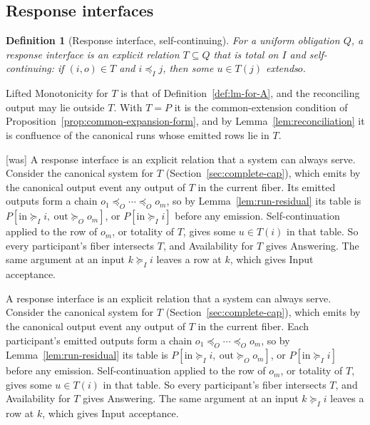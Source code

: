 \documentclass[sigconf]{cidr-2027}
\newtheorem{definition}{Definition}
\theoremstyle{remark}
\newcommand{\InputOrd}{\preceq_I}
\newcommand{\OutputOrd}{\preceq_O}
\newcommand{\InputGe}{\succeq_I}
\newcommand{\OutputGe}{\succeq_O}
\newcommand{\outrel}{extends\xspace}          %
\begin{document}
\subsection{Response interfaces}

\begin{definition}[Response interface, self-continuing]
\label{def:response-interface}
For a uniform obligation $Q$, a \emph{response interface} is an explicit
relation $T\subseteq Q$ that is total on $I$ and \emph{self-continuing}: if
$(i,o)\in T$ and $i\InputOrd j$, then some $u\in T(j)$ \outrel $o$.
\end{definition}

Lifted Monotonicity for $T$ is that of Definition~\ref{def:lm-for-A}, and
the reconciling output may lie outside $T$.  With $T=P$ it is the
common-extension condition of Proposition~\ref{prop:common-expansion-form}, and
by Lemma~\ref{lem:reconciliation} it is confluence of the canonical runs whose
emitted rows lie in $T$.



{\footnotesize\color{black!50}\noindent\textsf{[was]} A response interface is an explicit relation that a system can always
serve.  Consider the canonical system for $T$ (Section~\ref{sec:complete-cap}),
which emits by the canonical output event any output of $T$ in the
current fiber.  Its emitted outputs form a chain
$o_1\OutputOrd\cdots\OutputOrd o_m$, so by Lemma~\ref{lem:run-residual} its
table is $P[\mathrm{in}\InputGe i,\ \mathrm{out}\OutputGe o_m]$, or
$P[\mathrm{in}\InputGe i]$ before any emission.  Self-continuation applied to
the row of $o_m$, or totality of $T$, gives some $u\in T(i)$ in that table.
So every participant's fiber intersects $T$, and Availability for $T$ gives
Answering.  The same argument at an input $k\InputGe i$ leaves a row at $k$,
which gives Input acceptance.\par}

\color{blue!70!black}A response interface is an explicit relation that a system can always
serve.  Consider the canonical system for $T$ (Section~\ref{sec:complete-cap}),
which emits by the canonical output event any output of $T$ in the
current fiber.  Each participant's emitted outputs form a chain
$o_1\OutputOrd\cdots\OutputOrd o_m$, so by Lemma~\ref{lem:run-residual} its
table is $P[\mathrm{in}\InputGe i,\ \mathrm{out}\OutputGe o_m]$, or
$P[\mathrm{in}\InputGe i]$ before any emission.  Self-continuation applied to
the row of $o_m$, or totality of $T$, gives some $u\in T(i)$ in that table.
So every participant's fiber intersects $T$, and Availability for $T$ gives
Answering.  The same argument at an input $k\InputGe i$ leaves a row at $k$,
which gives Input acceptance.\color{black}
\end{document}
